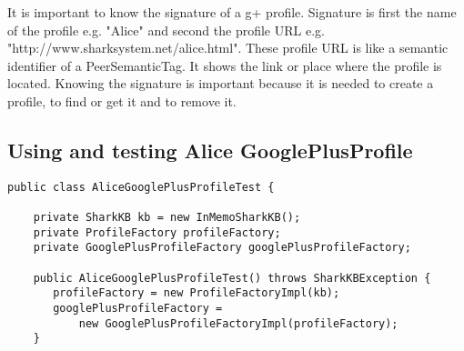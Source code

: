 \documentclass[12pt]{article}
\begin{document}
It is important to know the signature of a g+ profile. Signature is first the name of the profile e.g. "Alice" and second the profile URL e.g. "http://www.sharksystem.net/alice.html". These profile URL is like a semantic identifier of a PeerSemanticTag. It shows the link or place where the profile is located. Knowing the signature is important because it is needed to create a profile, to find or get it and to remove it.



\subsection{Using and testing Alice GooglePlusProfile}

\begin{verbatim}
public class AliceGooglePlusProfileTest {

    private SharkKB kb = new InMemoSharkKB();
    private ProfileFactory profileFactory;
    private GooglePlusProfileFactory googlePlusProfileFactory;

    public AliceGooglePlusProfileTest() throws SharkKBException {
       profileFactory = new ProfileFactoryImpl(kb);
       googlePlusProfileFactory =
           new GooglePlusProfileFactoryImpl(profileFactory);
    }


\end{verbatim}
\end{document}
